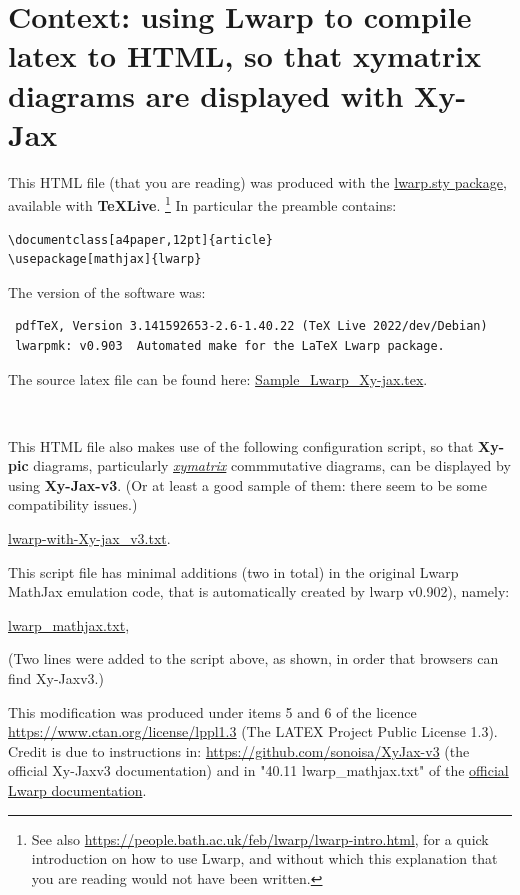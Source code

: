 \documentclass[a4paper,12pt]{article}
\newtheorem{Fundamental Theorem}{Fundamental Theorem}
\begin{document}
\section{Context: using Lwarp to compile latex to HTML, so that xymatrix diagrams are displayed with Xy-Jax}\label{Context}

\noindent This HTML file (that you are reading) was produced with the
\href{https://ctan.org/pkg/lwarp}{lwarp.sty package}, available with \textbf{TeXLive}.
\medskip
\footnote{See also \url{https://people.bath.ac.uk/feb/lwarp/lwarp-intro.html}, for a quick introduction on how to use Lwarp, and without which this explanation that you are reading would not have been written.}
\medskip
In particular the preamble contains:
\begin{verbatim}
\documentclass[a4paper,12pt]{article}
\usepackage[mathjax]{lwarp}
\end{verbatim}

\medskip
The version of the software was:
\begin{verbatim}
 pdfTeX, Version 3.141592653-2.6-1.40.22 (TeX Live 2022/dev/Debian)
 lwarpmk: v0.903  Automated make for the LaTeX Lwarp package.
\end{verbatim}

The source latex file can be found here: \href{Sample_Lwarp_Xy-jax.tex}{Sample\_Lwarp\_Xy-jax.tex}.

\

 \noindent This HTML file  also makes use of the following configuration script, so that {\textbf{Xy-pic}} diagrams, particularly \href{https://www.ctan.org/pkg/xymatrix}{\textit{xymatrix}} commmutative diagrams, can be displayed by using \textbf{Xy-Jax-v3}. (Or at least a good sample  of them: there seem to be some compatibility issues.)\\
\begin{center}
\href{lwarp-with-Xy-jax_v3.txt}{lwarp-with-Xy-jax\_v3.txt}.
\end{center}
This script file has minimal additions (two in total) in the original Lwarp MathJax emulation code, that is automatically created by  lwarp v0.902), namely:
\begin{center} \href{lwarp_mathjax.txt}{lwarp\_mathjax.txt}, \end{center}
 (Two lines were added to the script above, as shown,  in order that browsers can find Xy-Jaxv3.)

\noindent This modification was produced under items 5 and 6 of the licence \url{https://www.ctan.org/license/lppl1.3}  (The LATEX Project Public License 1.3).
\\
Credit is  due to instructions in: \url{https://github.com/sonoisa/XyJax-v3} (the official Xy-Jaxv3 documentation) and in  "40.11 lwarp\_mathjax.txt" of the \href{http://mirrors.ibiblio.org/CTAN/macros/latex/contrib/lwarp/lwarp.pdf}{official Lwarp documentation}.
\end{document}
